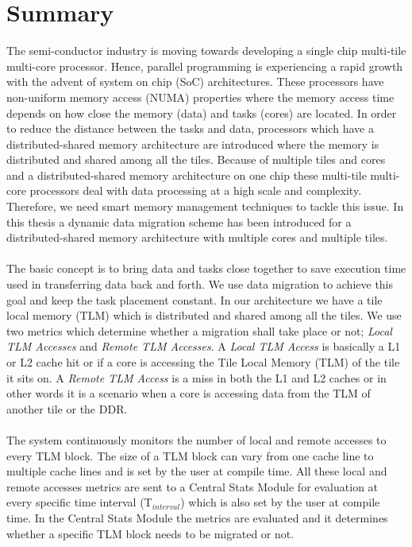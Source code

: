 \documentclass{listhesis}
\begin{document}
\section{Summary}
The semi-conductor industry is moving towards developing a single chip multi-tile multi-core processor. Hence, parallel programming is experiencing a rapid growth with the advent of system on chip (SoC) architectures. These processors have non-uniform memory access (NUMA) properties where the memory access time depends on how close the memory (data) and tasks (cores) are located. In order to reduce the distance between the tasks and data, processors which have a distributed-shared memory architecture are introduced where the memory is distributed and shared among all the tiles. Because of multiple tiles and cores and a distributed-shared memory architecture on one chip these multi-tile multi-core processors deal with data processing at a high scale and complexity. Therefore, we need smart memory management techniques to tackle this issue. In this thesis a dynamic data migration scheme has been introduced for a distributed-shared memory architecture with multiple cores and multiple tiles.\\
\\
The basic concept is to bring data and tasks close together to save execution time used in transferring data back and forth. We use data migration to achieve this goal and keep the task placement constant. In our architecture we have a tile local memory (TLM) which is distributed and shared among all the tiles. We use two metrics which determine whether a migration shall take place or not; \textit{Local TLM Accesses} and \textit{Remote TLM Accesses}. A \textit{Local TLM Access} is basically a L1 or L2 cache hit or if a core is accessing the Tile Local Memory (TLM) of the tile it sits on. A \textit{Remote TLM Access} is a miss in both the L1 and L2 caches or in other words it is a scenario when a core is accessing data from the TLM of another tile or the DDR. \\
\\
The system continuously monitors the number of local and remote accesses to every TLM block. The size of a TLM block can vary from one cache line to multiple cache lines and is set by the user at compile time. All these local and remote accesses metrics are sent to a Central Stats Module for evaluation at every specific time interval (T$_{interval}$) which is also set by the user at compile time. In the Central Stats Module the metrics are evaluated and it determines whether a specific TLM block needs to be migrated or not.\\
\end{document}
